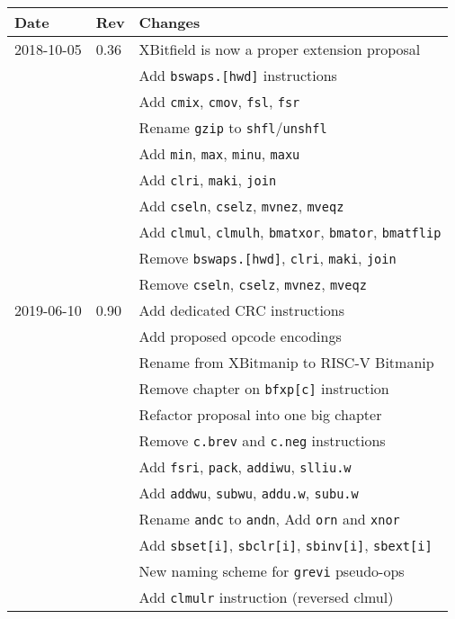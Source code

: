 \documentclass[twoside,11pt]{book}
\begin{document}
\begin{center}
\begin{tabular}{lll}
Date & Rev & Changes \\
\hline
2018-10-05 & 0.36 & XBitfield is now a proper extension proposal \\
           &      & Add {\tt bswaps.[hwd]} instructions \\
           &      & Add {\tt cmix}, {\tt cmov}, {\tt fsl}, {\tt fsr} \\
           &      & Rename {\tt gzip} to {\tt shfl}/{\tt unshfl} \\
           &      & Add {\tt min}, {\tt max}, {\tt minu}, {\tt maxu} \\
           &      & Add {\tt clri}, {\tt maki}, {\tt join} \\
           &      & Add {\tt cseln}, {\tt cselz}, {\tt mvnez}, {\tt mveqz} \\
           &      & Add {\tt clmul}, {\tt clmulh}, {\tt bmatxor}, {\tt bmator}, {\tt bmatflip} \\
           &      & Remove {\tt bswaps.[hwd]}, {\tt clri}, {\tt maki}, {\tt join} \\
           &      & Remove {\tt cseln}, {\tt cselz}, {\tt mvnez}, {\tt mveqz} \\
\hline
2019-06-10 & 0.90 & Add dedicated CRC instructions \\
           &      & Add proposed opcode encodings \\
           &      & Rename from XBitmanip to RISC-V Bitmanip \\
           &      & Remove chapter on {\tt bfxp[c]} instruction \\
           &      & Refactor proposal into one big chapter \\
           &      & Remove {\tt c.brev} and {\tt c.neg} instructions \\
           &      & Add {\tt fsri}, {\tt pack}, {\tt addiwu}, {\tt slliu.w} \\
           &      & Add {\tt addwu}, {\tt subwu}, {\tt addu.w}, {\tt subu.w} \\
           &      & Rename {\tt andc} to {\tt andn}, Add {\tt orn} and {\tt xnor} \\
           &      & Add {\tt sbset[i]}, {\tt sbclr[i]}, {\tt sbinv[i]}, {\tt sbext[i]} \\
           &      & New naming scheme for {\tt grevi} pseudo-ops \\
	   &      & Add {\tt clmulr} instruction (reversed clmul) \\

\end{tabular}
\end{center}
\end{document}

